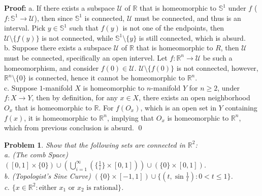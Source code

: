 \documentclass[12pt]{article}
\newtheorem{problem}{Problem}
\begin{document}
\textbf{Proof:} a. If there exists a subspace $\mathcal{U}$ of $\mathbb{R}$ that is homeomorphic to $\mathbb{S}^1$ under $f$ ($f: \mathbb{S}^1\to \mathcal{U}$), then since $\mathbb{S}^1$ is connected, $\mathcal{U}$ must be connected, and thus is an interval. Pick $y\in\mathbb{S}^1$ such that $f(y)$ is not one of the endpoints, then $\mathcal{U}\setminus \{f(y)\}$ is not connected, while $\mathbb{S}^1\setminus\{y\}$ is still connected, which is absurd. \\
\indent b. Suppose there exists a subspace $\mathcal{U}$ of $\mathbb{R}$ that is homeomorphic to $R$, then $\mathcal{U}$ must be connected, specifically an open intervel. Let $f: \mathbb{R}^n\to \mathcal{U}$ be such a homeomorphism, and consider $f(0)\in\mathcal{U}$. $\mathcal{U}\setminus\{f(0)\}$ is not connected, however, $\mathbb{R}^n\setminus\{0\}$ is connected, hence it cannot be homeomorphic to $\mathbb{R}^n$. \\
\indent c. Suppose $1$-manifold $X$ is homeomorphic to $n$-manifold $Y$ for $n\geq 2$, under $f: X\to Y$, then by definition, for any $x\in X$, there exists an open neighborhood $O_x$ that is homeomorphic to $\mathbb{R}$. For $f(O_x)$, which is an open set in $Y$ containing $f(x)$, it is homeomorphic to $\mathbb{R}^n$, implying that $O_x$ is homeomorphic to $\mathbb{R}^n$, which from previous conclusion is absurd. \qed

\begin{problem}
Show that the following sets are connected in $\mathbb{R}^2$: \\
\indent a. (The comb Space) $([0,1]\times\{0\})\cup(\bigcup_{i=1}^{\infty}(\{\frac{1}{i}\}\times[0,1]))\cup(\{0\}\times[0,1])$. \\
\indent b. (Topologist's Sine Curve) $(\{0\}\times [-1, 1])\cup \{(t, \sin\frac{1}{t}): 0<t\leq 1\}$. \\
\indent c. $\{x\in\mathbb{R}^2: \text{either } x_1 \text{ or } x_2 \text{ is rational}\}$.
\end{problem}
\end{document}
